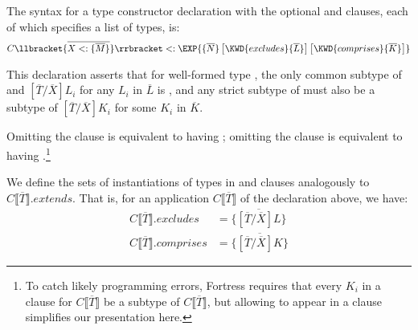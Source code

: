 \documentclass[10pt]{sigplanconf}
\renewcommand{\bar}{\overline}
\newcommand{\myexcludes}[1]{{#1}.\textit{excludes}}
\newcommand{\mycomprises}[1]{{#1}.\textit{comprises}}
\newcommand{\myextends}[1]{{#1}.\textit{extends}}
\newcommand{\extends}{\ensuremath{<:}}
\newcommand{\ob}[1]{\ensuremath{\llbracket {#1} \rrbracket}}
\newcommand{\obb}[1]{\ensuremath{\llbracket \bar{#1} \rrbracket}}
\newcommand{\bd}[1]{\ensuremath{\{\bar{#1}\}}}
\newcommand{\substb}[2]{\ensuremath{[\bar{#1}/\bar{#2}]}}
\newcommand{\bds}[2]{\ensuremath{\bar{{#1} \extends \bd{#2}}}}
\newcommand{\tplist}[2]{\ensuremath{\ob{\bds{#1}{#2}}}}
\newcommand{\Bottom}{\TYP{Bottom}}
\begin{document}
The syntax for a type constructor declaration
with the optional  and  clauses, 
each of which specifies a list of types,
is:
\[
C\tplist{X}{M} \extends \EXP{\lbrace\bar{N}\rbrace\, \bigl[\KWD{excludes} \lbrace\bar{L}\rbrace\bigr]\, \bigl[\KWD{comprises} \lbrace\bar{K}\rbrace\bigr]}
\]

This declaration asserts that for well-formed type \EXP{C\llbracket\bar{T}\rrbracket}, 
the only common subtype of \EXP{C\llbracket\bar{T}\rrbracket} 
and $\substb{T}{X}L_i$ for any $L_i$ in $\bar{L}$ 
is \Bottom, 
and any strict subtype of \EXP{C\llbracket\bar{T}\rrbracket} 
must also be a subtype of $\substb{T}{X}K_i$ for some $K_i$ in $\bar{K}$.



Omitting the  clause is equivalent to having ;
omitting the  clause is equivalent to having .\!\footnote{%
To catch likely programming errors, 
Fortress requires that 
every $K_i$ in a  clause for $C\obb{T}$ be a subtype of $C\obb{T}$, 
but allowing  to appear in a  clause simplifies our presentation here.}

We define the sets of instantiations of types 
in  and  clauses analogously to $\myextends{C\obb{T}}$.
That is, 
for an application $C\obb{T}$ 
of the declaration above, we have:\\[-.5em]
\begin{align*}
\myexcludes{C\obb{T}}  &= \{ \bar{\substb{T}{X}L} \} \\
\mycomprises{C\obb{T}} &= \{ \bar{\substb{T}{X}K} \}
\end{align*}
\end{document}
